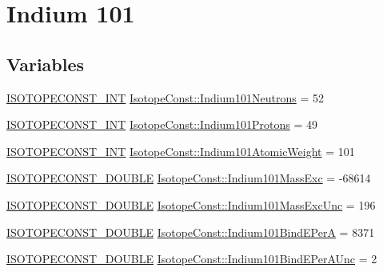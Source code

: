 \hypertarget{group___isotope_const-_indium-_in101}{}\section{Indium 101}
\label{group___isotope_const-_indium-_in101}
\subsection*{Variables}
\begin{DoxyCompactItemize}
\item 
\mbox{\hyperlink{group___isotope_const-_macros_ga5f18360b3e99483a35c32d789e62621c}{I\+S\+O\+T\+O\+P\+E\+C\+O\+N\+S\+T\+\_\+\+I\+NT}} \mbox{\hyperlink{group___isotope_const-_indium-_in101_ga4665d89b58e9fccb3330190c4353ad5e}{Isotope\+Const\+::\+Indium101\+Neutrons}} = 52
\item 
\mbox{\hyperlink{group___isotope_const-_macros_ga5f18360b3e99483a35c32d789e62621c}{I\+S\+O\+T\+O\+P\+E\+C\+O\+N\+S\+T\+\_\+\+I\+NT}} \mbox{\hyperlink{group___isotope_const-_indium-_in101_ga0ed8876ea37cb1ca41767abc8a82e975}{Isotope\+Const\+::\+Indium101\+Protons}} = 49
\item 
\mbox{\hyperlink{group___isotope_const-_macros_ga5f18360b3e99483a35c32d789e62621c}{I\+S\+O\+T\+O\+P\+E\+C\+O\+N\+S\+T\+\_\+\+I\+NT}} \mbox{\hyperlink{group___isotope_const-_indium-_in101_gadc08604b069204f3acecb1eecd0cbcc9}{Isotope\+Const\+::\+Indium101\+Atomic\+Weight}} = 101
\item 
\mbox{\hyperlink{group___isotope_const-_macros_ga8f45a7272ce02c0b4c65c44636ed719a}{I\+S\+O\+T\+O\+P\+E\+C\+O\+N\+S\+T\+\_\+\+D\+O\+U\+B\+LE}} \mbox{\hyperlink{group___isotope_const-_indium-_in101_gaec72baa783d8d4528842ba314f36b695}{Isotope\+Const\+::\+Indium101\+Mass\+Exc}} = -\/68614
\item 
\mbox{\hyperlink{group___isotope_const-_macros_ga8f45a7272ce02c0b4c65c44636ed719a}{I\+S\+O\+T\+O\+P\+E\+C\+O\+N\+S\+T\+\_\+\+D\+O\+U\+B\+LE}} \mbox{\hyperlink{group___isotope_const-_indium-_in101_ga5d85ec32001776df302ef62f0e85699d}{Isotope\+Const\+::\+Indium101\+Mass\+Exc\+Unc}} = 196
\item 
\mbox{\hyperlink{group___isotope_const-_macros_ga8f45a7272ce02c0b4c65c44636ed719a}{I\+S\+O\+T\+O\+P\+E\+C\+O\+N\+S\+T\+\_\+\+D\+O\+U\+B\+LE}} \mbox{\hyperlink{group___isotope_const-_indium-_in101_ga37097b1359e5c8ab79dc021766be3737}{Isotope\+Const\+::\+Indium101\+Bind\+E\+PerA}} = 8371
\item 
\mbox{\hyperlink{group___isotope_const-_macros_ga8f45a7272ce02c0b4c65c44636ed719a}{I\+S\+O\+T\+O\+P\+E\+C\+O\+N\+S\+T\+\_\+\+D\+O\+U\+B\+LE}} \mbox{\hyperlink{group___isotope_const-_indium-_in101_gad27cf1df8fbf93ea7650683adbd4a0b9}{Isotope\+Const\+::\+Indium101\+Bind\+E\+Per\+A\+Unc}} = 2

\end{DoxyCompactItemize}

